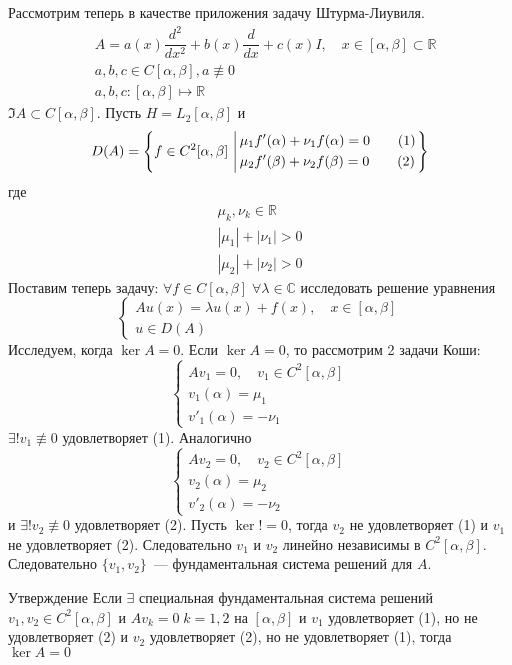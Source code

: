 \documentclass[14pt]{extarticle}
\begin{document}
Рассмотрим теперь в качестве приложения задачу Штурма-Лиувиля.
\begin{align*}
    &A = a(x)\dfrac{d^2}{dx^2} + b(x)\dfrac{d}{dx} + c(x)I,\quad x \in [\alpha, \beta] \subset 
    \mathbb R\\
    &a, b, c \in C[\alpha, \beta], a \not\equiv 0\\
    &a, b, c : [\alpha, \beta] \mapsto \mathbb R
\end{align*}
$\Im A \subset C[\alpha, \beta]$.
Пусть $H = L_2[\alpha, \beta]$ и 
$$
D(A) = \left\{f \in C^2[\alpha, \beta] \left\arrowvert
\begin{aligned}
    &\mu_1f'(\alpha) + \nu_1f(\alpha) = 0 \qquad (1)\\
    &\mu_2  f'(\beta) + \nu_2  f(\beta) = 0 \qquad (2)
\end{aligned}
\right.
\right\}
$$
где
\begin{gather*}
    \mu_k, \nu_k \in \mathbb R\\
    |\mu_1| + |\nu_1| > 0\\
    |\mu_2| + |\nu_2| > 0
\end{gather*}
Поставим теперь задачу: $\forall f \in C[\alpha, \beta]\; \forall \lambda \in \mathbb C$
исследовать решение уравнения
$$
\left\{
\begin{array}{l}
    Au(x) = \lambda u(x) + f(x), \quad x \in [\alpha, \beta]\\
    u \in D(A)
\end{array}
\right.
$$
Исследуем, когда $\ker A = 0$.
Если $\ker A = 0$, то рассмотрим 2 задачи Коши:
$$
\left\{
\begin{array}{l}
    Av_1 = 0, \quad v_1 \in C^2[\alpha, \beta]\\
    v_1(\alpha) = \mu_1\\
    v'_1(\alpha) = -\nu_1
\end{array}
\right.
$$
$\exists! v_1 \not\equiv 0$ удовлетворяет (1).
Аналогично
$$
\left\{
\begin{array}{l}
    Av_2 = 0, \quad v_2 \in C^2[\alpha, \beta]\\
    v_2(\alpha) = \mu_2\\
    v'_2(\alpha) = -\nu_2
\end{array}
\right.
$$
и $\exists! v_2 \not\equiv 0$ удовлетворяет (2).
Пусть $\ker ! = 0$, тогда $v_2$ не удовлетворяет (1) и $v_1$ не удовлетворяет (2).
Следовательно $v_1$ и $v_2$ линейно независимы в $C^2[\alpha, \beta]$.
Следовательно $\{v_1, v_2\}$~--- фундаментальная система решений для $A$.
\begin{MathCl}{Утверждение}
    Если $\exists$ специальная фундаментальная система решений $v_1 ,v_2 \in C^2[\alpha,
    \beta]$ и $Av_k = 0\; k=1,2$ на $[\alpha, \beta]$ и $v_1$ удовлетворяет (1), но не
    удовлетворяет (2) и $v_2$ удовлетворяет (2), но не удовлетворяет (1), тогда
    $\ker A = 0$
\end{MathCl}
\end{document}
